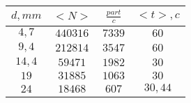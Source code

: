 \begin{tabular}{| c | c | c | c |}
\hline
$d, mm$ & $<N>$ & $\frac{part}{c}$ & $<t>, c$\\
\hline
$4,7$ & $440316$ & $7339$ & $60$\\
\hline
$9,4$ & $212814$ & $3547$ & $60$\\
\hline
$14,4$ & $59471$ & $1982$ & $30$\\
\hline
$19$ & $31885$ & $1063$ & $30$\\
\hline
$24$ & $18468$ & $607$ & $30,44$\\
\hline
\end{tabular}
